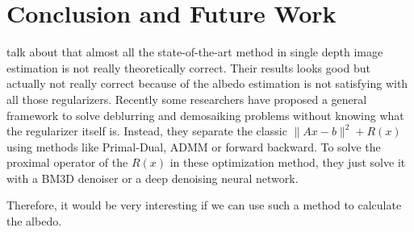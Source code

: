 \chapter{Conclusion and Future Work} \label{chap:conclusion}

talk about that almost all the state-of-the-art method in single depth image estimation is not really theoretically correct. Their results looks good but actually not really correct because of the albedo estimation is not satisfying with all those regularizers.
Recently some researchers have proposed a general framework to solve deblurring and demosaiking problems without knowing what the regularizer itself is.
Instead, they separate the classic $\lVert Ax - b\rVert^2 + R(x)$ using methods like Primal-Dual, ADMM or forward backward. To solve the proximal operator of the $R(x)$ in these optimization method, they just solve it with a BM3D denoiser\cite{heide2014flexisp} or a deep denoising neural network\cite{meinhardt2017learning}.

Therefore, it would be very interesting if we can use such a method to calculate the albedo. 